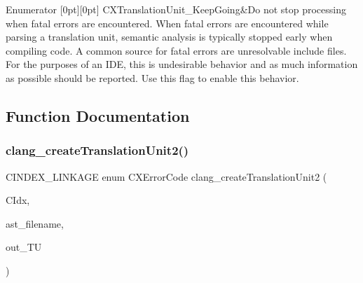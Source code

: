 \begin{DoxyEnumFields}{Enumerator}
[0pt][0pt]{}\mbox{\label{group__CINDEX__TRANSLATION__UNIT_ggab1e4965c1ebe8e41d71e90203a723fe9afda3272e16e2aa499fc265615991f968}} 
C\+X\+Translation\+Unit\+\_\+\+Keep\+Going&Do not stop processing when fatal errors are encountered. When fatal errors are encountered while parsing a translation unit, semantic analysis is typically stopped early when compiling code. A common source for fatal errors are unresolvable include files. For the purposes of an I\+DE, this is undesirable behavior and as much information as possible should be reported. Use this flag to enable this behavior. \\
\hline

\end{DoxyEnumFields}


\subsection{Function Documentation}
\mbox{\label{group__CINDEX__TRANSLATION__UNIT_ga749a8220b23a06ba2fdcbea06d6bb211}} 
\subsubsection{\texorpdfstring{clang\+\_\+create\+Translation\+Unit2()}{clang\_createTranslationUnit2()}}
{\footnotesize\ttfamily C\+I\+N\+D\+E\+X\+\_\+\+L\+I\+N\+K\+A\+GE enum C\+X\+Error\+Code clang\+\_\+create\+Translation\+Unit2 (\begin{DoxyParamCaption}\item[{\hyperlink{group__CINDEX_gae039c2574bfd75774ca7a9a3e55910cb}{C\+X\+Index}}]{C\+Idx,  }\item[{const char $\ast$}]{ast\+\_\+filename,  }\item[{\hyperlink{group__CINDEX_gacdb7815736ca709ce9a5e1ec2b7e16ac}{C\+X\+Translation\+Unit} $\ast$}]{out\+\_\+\+TU }\end{DoxyParamCaption})}



